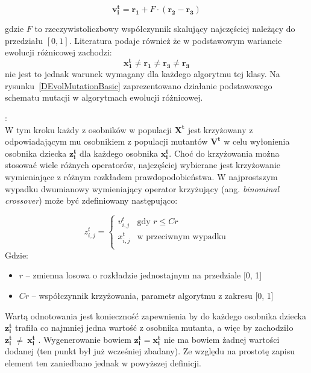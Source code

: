 \documentclass[12pt,a4paper]{report}
\begin{document}
{{{\begin{description}
\begin{equation} \label{eq:DiffMutation}
 \mathbf{v_i^{t}} = \mathbf{r_1} + F \cdot (\mathbf{r_2} - \mathbf{r_3})
\end{equation}

gdzie $F$ to rzeczywistoliczbowy współczynnik skalujący najczęściej należący do przedziału $[0, 1]$. Literatura \cite{SpringerIntroToEvol} podaje również że w podstawowym wariancie ewolucji różnicowej zachodzi:
\begin{equation}
\mathbf{x_1^{t}} \neq \mathbf{r_1} \neq \mathbf{r_3} \neq \mathbf{r_3}
\end{equation}
nie jest to jednak warunek wymagany dla każdego algorytmu tej klasy. Na rysunku~\ref{DEvolMutationBasic} zaprezentowano działanie podstawowego schematu mutacji w algorytmach ewolucji różnicowej.


	  \item[Krzyżowanie]:\\
  W tym kroku każdy z osobników w populacji $\mathbf{X^{t}}$ jest krzyżowany z odpowiadającym mu osobnikiem z populacji mutantów $\mathbf{V^{t}}$ w celu wyłonienia osobnika dziecka $\mathbf{z_i^{t}}$ dla każdego osobnika $\mathbf{x_i^{t}}$. Choć do krzyżowania można stosować wiele różnych operatorów, najczęściej wybierane jest krzyżowanie wymieniające z różnym rozkładem prawdopodobieństwa. W najprostszym wypadku dwumianowy wymieniający operator krzyżujący (ang. \emph{binominal crossover}) może być zdefiniowany następująco:
  
\begin{equation}
\label{eq:BasicCrossover}
z_{i,j}^{t} = \left\{ \begin{array}{ll}
v_{i,j}^{t} & \textrm{gdy $r \le Cr$}\\
x_{i,j}^{t} & \textrm{w przeciwnym wypadku}\\
\end{array} \right.
\end{equation}
Gdzie:
\begin{itemize}
\item $r$ -- zmienna losowa o rozkładzie jednostajnym na przedziale [0, 1]
\item $Cr$ -- współczynnik krzyżowania, parametr algorytmu z zakresu [0, 1]
\end{itemize}
Wartą odnotowania jest konieczność zapewnienia by do każdego osobnika dziecka $\mathbf{z_i^{t}}$ trafiła co najmniej jedna wartość z osobnika mutanta, a więc by zachodziło $\mathbf{z_i^{t}}~\neq~\mathbf{x_i^{t}}$ \cite{SpringerIntroToEvol}. Wygenerowanie bowiem $\mathbf{z_i^{t}} = \mathbf{x_i^{t}}$  nie ma bowiem żadnej wartości dodanej (ten punkt był już wcześniej zbadany). Ze względu na prostotę zapisu element ten zaniedbano jednak w powyższej definicji.



\end{description}}}}
\end{document}

